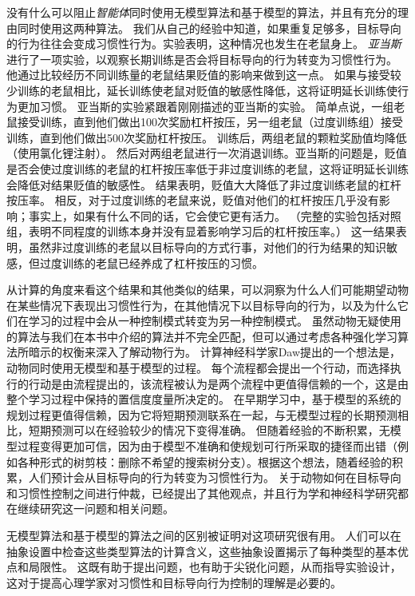 没有什么可以阻止\textit{智能体}同时使用无模型算法和基于模型的算法，并且有充分的理由同时使用这两种算法。
我们从自己的经验中知道，如果重复足够多，目标导向的行为往往会变成习惯性行为。实验表明，这种情况也发生在老鼠身上。
\textit{亚当斯}\cite{adams1982variations}进行了一项实验，以观察长期训练是否会将目标导向的行为转变为习惯性行为。
他通过比较经历不同训练量的老鼠结果贬值的影响来做到这一点。
如果与接受较少训练的老鼠相比，延长训练使老鼠对贬值的敏感性降低，这将证明延长训练使行为更加习惯。
亚当斯的实验紧跟着刚刚描述的亚当斯\cite{adams1981instrumental}的实验。
简单点说，一组老鼠接受训练，直到他们做出100次奖励杠杆按压，另一组老鼠（过度训练组）接受训练，直到他们做出500次奖励杠杆按压。
训练后，两组老鼠的颗粒奖励值均降低（使用氯化锂注射）。
然后对两组老鼠进行一次消退训练。亚当斯的问题是，贬值是否会使过度训练的老鼠的杠杆按压率低于非过度训练的老鼠，这将证明延长训练会降低对结果贬值的敏感性。
结果表明，贬值大大降低了非过度训练老鼠的杠杆按压率。
相反，对于过度训练的老鼠来说，贬值对他们的杠杆按压几乎没有影响；事实上，如果有什么不同的话，它会使它更有活力。
（完整的实验包括对照组，表明不同程度的训练本身并没有显着影响学习后的杠杆按压率。）
这一结果表明，虽然非过度训练的老鼠以目标导向的方式行事，对他们的行为结果的知识敏感，但过度训练的老鼠已经养成了杠杆按压的习惯。



从计算的角度来看这个结果和其他类似的结果，可以洞察为什么人们可能期望动物在某些情况下表现出习惯性行为，在其他情况下以目标导向的行为，以及为什么它们在学习的过程中会从一种控制模式转变为另一种控制模式。
虽然动物无疑使用的算法与我们在本书中介绍的算法并不完全匹配，但可以通过考虑各种强化学习算法所暗示的权衡来深入了解动物行为。
计算神经科学家Daw\cite{daw2005uncertainty}提出的一个想法是，动物同时使用无模型和基于模型的过程。
每个流程都会提出一个行动，而选择执行的行动是由流程提出的，该流程被认为是两个流程中更值得信赖的一个，这是由整个学习过程中保持的置信度度量所决定的。
在早期学习中，基于模型的系统的规划过程更值得信赖，因为它将短期预测联系在一起，与无模型过程的长期预测相比，短期预测可以在经验较少的情况下变得准确。
但随着经验的不断积累，无模型过程变得更加可信，因为由于模型不准确和使规划可行所采取的捷径而出错（例如各种形式的树剪枝：删除不希望的搜索树分支）。根据这个想法，随着经验的积累，人们预计会从目标导向的行为转变为习惯性行为。
关于动物如何在目标导向和习惯性控制之间进行仲裁，已经提出了其他观点，并且行为学和神经科学研究都在继续研究这一问题和相关问题。


无模型算法和基于模型的算法之间的区别被证明对这项研究很有用。
人们可以在抽象设置中检查这些类型算法的计算含义，这些抽象设置揭示了每种类型的基本优点和局限性。
这既有助于提出问题，也有助于尖锐化问题，从而指导实验设计，这对于提高心理学家对习惯性和目标导向行为控制的理解是必要的。



